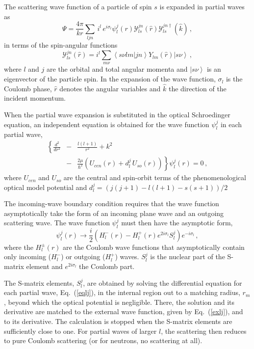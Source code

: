 \documentclass[twocolumn,amsmath,amssymb,10pt,groupedaddress,a4paper]{revtex4}
\begin{document}
The scattering wave function of a particle of spin $s$ is expanded in
partial waves as \begin{equation}
\Psi=\frac{4\pi}{kr}\sum_{ljn}\, i^{l}\, e^{i\sigma_{l}}\psi_{l}^{j}(r){\mathcal{Y}}_{ls}^{jn}(\hat{r}){\mathcal{Y}}_{ls}^{jn\dagger}(\hat{k})\,,\label{parwav}\end{equation}
 in terms of the spin-angular functions \begin{equation}
{\mathcal{Y}}_{ls}^{jn}(\hat{r})=i^{l}\sum_{m\nu}\left\langle s\nu
lm|jn\right\rangle Y_{lm}(\hat{r})\left|s\nu\right\rangle \,,\end{equation}
 where $l$ and $j$ are the orbital and total angular momenta and
$\left|s\nu\right\rangle $ is an eigenvector of the particle spin.
In the expansion of the wave function, $\sigma_{l}$ is the Coulomb
phase, $\hat{r}$ denotes the angular variables and $\hat{k}$ the
direction of the incident momentum.

When the partial wave expansion is substituted in the optical Schroedinger
equation, an independent equation is obtained for the wave function
$\psi_{l}^{j}$ in each partial wave, \begin{eqnarray}
\left\{ \frac{d^{2}}{dr^{2}}\right. & - & \frac{l(l+1)}{r^{2}}+k^{2}\label{eqlj}\\
 & - & \left.\frac{2\mu}{\hbar^{2}}\left(U_{cen}(r)+d_{l}^{j}\, U_{so}(r)\right)\right\} \psi_{l}^{j}(r)=0\,,\nonumber\end{eqnarray}
 where $U_{cen}$ and $U_{so}$ are the central and spin-orbit terms
of the phenomenological optical model potential and $d_{l}^{j}=(j(j+1)-l(l+1)-s(s+1))/2$

The incoming-wave boundary condition requires that the wave function
asymptotically take the form of an incoming plane wave and an outgoing
scattering wave. The wave function $\psi_{l}^{j}$ must then have
the asymptotic form, \begin{equation}
\psi_{l}^{j}(r)\rightarrow\frac{i}{2}\left(H_{l}^{-}(r)-H_{l}^{+}(r)e^{2i\sigma_{l}}S_{l}^{j}\right)e^{-i\sigma_{l}}\,,\label{exlj}\end{equation}
 where the $H_{l}^{\pm}(r)$ are the
Coulomb wave functions that asymptotically contain only incoming ($H_{l}^{-}$)
or outgoing ($H_{l}^{+}$) waves. $S_{l}^{j}$ is the nuclear part
of the S-matrix element and $e^{2i\sigma_{l}}$ the Coulomb part.

The S-matrix elements, $S_{l}^{j}$, are obtained by solving the differential
equation for each partial wave, Eq.~(\ref{eqlj}), in the internal
region out to a matching radius, $r_{m}$, beyond which the optical
potential is negligible. There, the solution and its derivative are
matched to the external wave function, given by Eq.~(\ref{exlj}),
and to its derivative. The calculation is stopped when the S-matrix
elements are sufficiently close to one. For partial waves of larger
$l$, the scattering then reduces to pure Coulomb scattering (or for
neutrons, no scattering at all).
\end{document}
